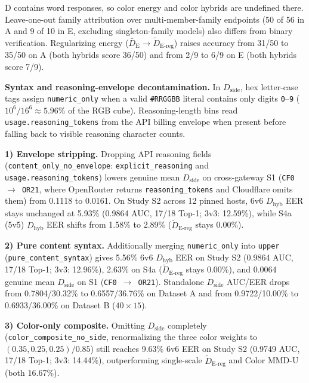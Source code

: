\documentclass[10pt,letterpaper]{article}
\theoremstyle{definition}
\newcommand{\Denergy}{\bar D_{\mathrm E}}
\newcommand{\Dereg}{\tilde D_{\mathrm{E\mbox{-}reg}}}
\newcommand{\Dside}{D_{\mathrm{side}}}
\newcommand{\Dhyb}{D_{\mathrm{hyb}}}
\begin{document}
D contains word responses, so color energy and color hybrids are undefined there. Leave-one-out family attribution over multi-member-family endpoints (50 of 56 in A and 9 of 10 in E, excluding singleton-family models) also differs from binary verification. Regularizing energy ($\Denergy{} \to \Dereg{}$) raises accuracy from 31/50 to 35/50 on A (both hybrids score 36/50) and from 2/9 to 6/9 on E (both hybrids score 7/9).


\textbf{Syntax and reasoning-envelope decontamination.} In $\Dside{}$, hex letter-case tags assign \texttt{numeric\_\allowbreak{}only} when a valid \texttt{\#RRGGBB} literal contains only digits \texttt{0}--\texttt{9} ($10^6/16^6 \approx 5.96\%$ of the RGB cube). Reasoning-length bins read \texttt{usage.\allowbreak{}reasoning\_\allowbreak{}tokens} from the API billing envelope when present before falling back to visible reasoning character counts.


\textbf{1) Envelope stripping.} Dropping API reasoning fields (\texttt{content\_\allowbreak{}only\_\allowbreak{}no\_\allowbreak{}envelope}: \texttt{explicit\_\allowbreak{}reasoning} and \texttt{usage.\allowbreak{}reasoning\_\allowbreak{}tokens}) lowers genuine mean $\Dside{}$ on cross-gateway S1 (\texttt{CF0 \ensuremath{\rightarrow} OR21}, where OpenRouter returns \texttt{reasoning\_\allowbreak{}tokens} and Cloudflare omits them) from 0.1118 to 0.0161. On Study S2 across 12 pinned hosts, 6v6 $\Dhyb{}$ EER stays unchanged at 5.93\% (0.9864 AUC, 17/18 Top-1; 3v3: 12.59\%), while S4a (5v5) $\Dhyb{}$ EER shifts from 1.58\% to 2.89\% ($\Dereg{}$ stays 0.00\%).


\textbf{2) Pure content syntax.} Additionally merging \texttt{numeric\_\allowbreak{}only} into \texttt{upper} (\texttt{pure\_\allowbreak{}content\_\allowbreak{}syntax}) gives 5.56\% 6v6 $\Dhyb{}$ EER on Study S2 (0.9864 AUC, 17/18 Top-1; 3v3: 12.96\%), 2.63\% on S4a ($\Dereg{}$ stays 0.00\%), and 0.0064 genuine mean $\Dside{}$ on S1 (\texttt{CF0 \ensuremath{\rightarrow} OR21}). Standalone $\Dside{}$ AUC/EER drops from 0.7804/30.32\% to 0.6557/36.76\% on Dataset A and from 0.9722/10.00\% to 0.6933/36.00\% on Dataset B ($40\times 15$).


\textbf{3) Color-only composite.} Omitting $\Dside{}$ completely (\texttt{color\_\allowbreak{}composite\_\allowbreak{}no\_\allowbreak{}side}, renormalizing the three color weights to $(0.35, 0.25, 0.25)/0.85$) still reaches 9.63\% 6v6 EER on Study S2 (0.9749 AUC, 17/18 Top-1; 3v3: 14.44\%), outperforming single-scale $\Dereg{}$ and Color MMD-U (both 16.67\%).
\end{document}
